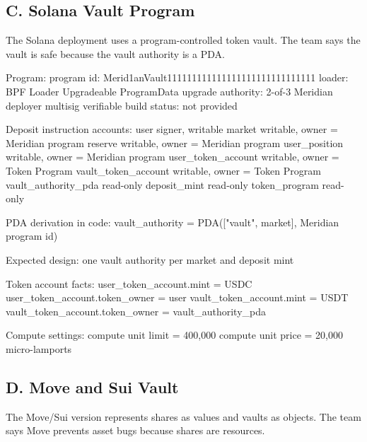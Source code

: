 \subsection*{C. Solana Vault Program}

The Solana deployment uses a program-controlled token vault. The team says the vault is safe because the vault authority is a PDA.

\begin{codeblock}
Program:
    program id: Merid1anVault111111111111111111111111111111
    loader: BPF Loader Upgradeable
    ProgramData upgrade authority: 2-of-3 Meridian deployer multisig
    verifiable build status: not provided

Deposit instruction accounts:
    user                         signer, writable
    market                       writable, owner = Meridian program
    reserve                      writable, owner = Meridian program
    user_position                writable, owner = Meridian program
    user_token_account           writable, owner = Token Program
    vault_token_account          writable, owner = Token Program
    vault_authority_pda          read-only
    deposit_mint                 read-only
    token_program                read-only

PDA derivation in code:
    vault_authority = PDA(["vault", market], Meridian program id)

Expected design:
    one vault authority per market and deposit mint

Token account facts:
    user_token_account.mint = USDC
    user_token_account.token_owner = user
    vault_token_account.mint = USDT
    vault_token_account.token_owner = vault_authority_pda

Compute settings:
    compute unit limit = 400,000
    compute unit price = 20,000 micro-lamports
\end{codeblock}

\subsection*{D. Move and Sui Vault}

The Move/Sui version represents shares as values and vaults as objects. The team says Move prevents asset bugs because shares are resources.

